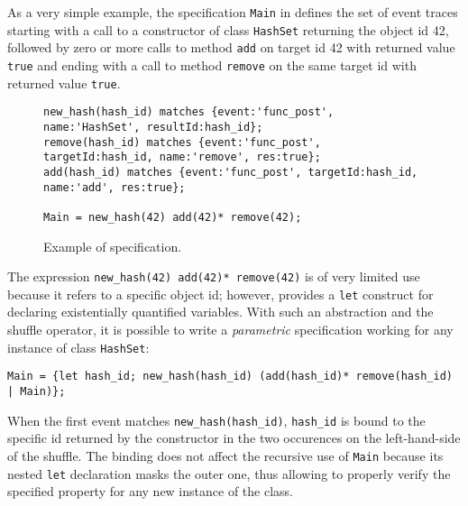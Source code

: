 As a very simple example, the specification \lstinline{Main} in  defines the set of event traces starting with a call to
a constructor of class \lstinline{HashSet} returning the object id 42, followed by zero or more calls to method \lstinline{add} on target id 42 with returned value \lstinline{true} and ending with a call to method \lstinline{remove} on the same target id with returned value \lstinline{true}.

\begin{figure}[h]
\begin{lstlisting}[basicstyle=\ttfamily\scriptsize]
new_hash(hash_id) matches {event:'func_post', name:'HashSet', resultId:hash_id};
remove(hash_id) matches {event:'func_post', targetId:hash_id, name:'remove', res:true};
add(hash_id) matches {event:'func_post', targetId:hash_id, name:'add', res:true};

Main = new_hash(42) add(42)* remove(42);
\end{lstlisting}
\caption{Example of specification.}\label{example}
\end{figure}

The expression \lstinline{new_hash(42) add(42)* remove(42)} is of very limited use because it refers to a specific object id;
however, \rml provides a \lstinline{let} construct \cite{AnconaFM17} for declaring existentially quantified variables.
With such an abstraction and the shuffle operator, it is possible to write a \emph{parametric} specification working for any instance of class \lstinline{HashSet}:
\begin{lstlisting}[basicstyle=\ttfamily\scriptsize]
Main = {let hash_id; new_hash(hash_id) (add(hash_id)* remove(hash_id) | Main)};
\end{lstlisting}
When the first event matches \lstinline{new_hash(hash_id)}, \lstinline{hash_id} is bound to the specific id returned by the constructor in the two
occurences on the left-hand-side of the shuffle. The binding does not affect the recursive use of \lstinline{Main}
because its nested \lstinline{let} declaration masks the outer one, thus allowing to properly verify the specified property
for any new instance of the class.

